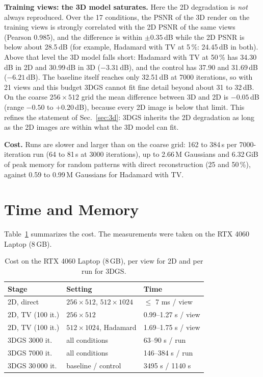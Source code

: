 \documentclass[conference]{IEEEtran}
\begin{document}
\textbf{Training views: the 3D model saturates.} Here the 2D degradation is \emph{not} always reproduced. Over the 17 conditions, the
PSNR of the 3D render on the training views is strongly correlated with the 2D PSNR of the same views (Pearson 0.985), and the
difference is within $\pm0.35$\,dB while the 2D PSNR is below about 28.5\,dB (for example, Hadamard with TV at 5\,\%: 24.45\,dB in both).
Above that level the 3D model falls short: Hadamard with TV at 50\,\% has 34.30\,dB in 2D and 30.99\,dB in 3D ($-3.31$\,dB), and
the control has 37.90 and 31.69\,dB ($-6.21$\,dB). The baseline itself reaches only 32.51\,dB at 7000 iterations, so with 21 views
and this budget 3DGS cannot fit fine detail beyond about 31 to 32\,dB. On the coarse $256\times512$ grid the mean difference between
3D and 2D is $-0.05$\,dB (range $-0.50$ to $+0.20$\,dB), because every 2D image is below that limit. This refines the statement of
Sec.~\ref{sec:3d}: 3DGS inherits the 2D degradation as long as the 2D images are within what the 3D model can fit.

\textbf{Cost.} Runs are slower and larger than on the coarse grid: 162 to 384\,s per 7000-iteration run (64 to 81\,s at 3000
iterations), up to 2.66\,M Gaussians and 6.32\,GiB of peak memory for random patterns with direct reconstruction (25 and
50\,\%), against 0.59 to 0.99\,M Gaussians for Hadamard with TV.

\section{Time and Memory}
\label{sec:time}
Table~\ref{tab:time} summarizes the cost. The measurements were taken on the RTX 4060 Laptop (8\,GB).

\begin{table}[t]
\caption{Cost on the RTX 4060 Laptop (8\,GB), per view for 2D and per run for 3DGS.}
\label{tab:time}
\centering
\footnotesize
\setlength{\tabcolsep}{3pt}
\begin{tabular}{lll}
\toprule
Stage & Setting & Time\\
\midrule
2D, direct & $256\times512$, $512\times1024$ & $\le$ 7 ms / view \\
2D, TV (100 it.) & $256\times512$ & 0.99--1.27 s / view \\
2D, TV (100 it.) & $512\times1024$, Hadamard & 1.69--1.75 s / view \\
3DGS 3000 it. & all conditions & 63--90 s / run \\
3DGS 7000 it. & all conditions & 146--384 s / run \\
3DGS 30\,000 it. & baseline / control & 3495 s / 1140 s \\
\bottomrule
\end{tabular}
\end{table}
\end{document}
